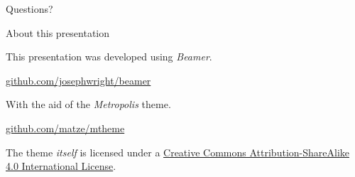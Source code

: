 \documentclass[10pt]{beamer}
\begin{document}
\begin{frame}[standout]
  Questions?
\end{frame}

\appendix

\begin{frame}{About this presentation}

  This presentation was developed using \emph{Beamer}.

 \begin{center}\url{github.com/josephwright/beamer}\end{center}


  With the aid of the \emph{Metropolis} theme.

  \begin{center}\url{github.com/matze/mtheme}\end{center}


  The theme \emph{itself} is licensed under a
  \href{http://creativecommons.org/licenses/by-sa/4.0/}{Creative Commons
  Attribution-ShareAlike 4.0 International License}.

  \begin{center}\ccbysa\end{center}

\end{frame}
\end{document}
